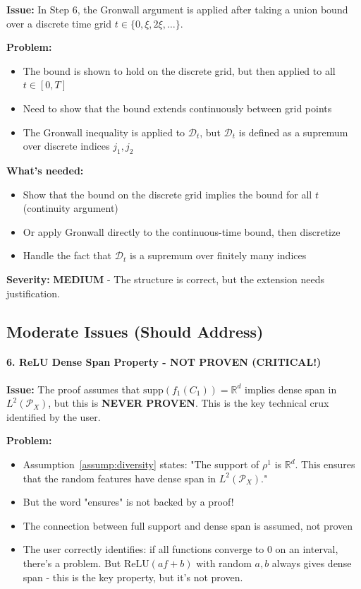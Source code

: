 \textbf{Issue:} In Step 6, the Gronwall argument is applied after taking a union bound over a discrete time grid $t \in \{0, \xi, 2\xi, \ldots\}$.

\textbf{Problem:}
\begin{itemize}
\item The bound is shown to hold on the discrete grid, but then applied to all $t \in [0, T]$
\item Need to show that the bound extends continuously between grid points
\item The Gronwall inequality is applied to $\mathscr{D}_t$, but $\mathscr{D}_t$ is defined as a supremum over discrete indices $j_1, j_2$
\end{itemize}

\textbf{What's needed:}
\begin{itemize}
\item Show that the bound on the discrete grid implies the bound for all $t$ (continuity argument)
\item Or apply Gronwall directly to the continuous-time bound, then discretize
\item Handle the fact that $\mathscr{D}_t$ is a supremum over finitely many indices
\end{itemize}

\textbf{Severity:} \textbf{MEDIUM} - The structure is correct, but the extension needs justification.

\subsection{Moderate Issues (Should Address)}

\paragraph*{6. ReLU Dense Span Property - NOT PROVEN (CRITICAL!)}

\textbf{Issue:} The proof assumes that $\text{supp}(f_1(C_1)) = \mathbb{R}^d$ implies dense span in $L^2(\mathcal{P}_X)$, but this is \textbf{NEVER PROVEN}. This is the key technical crux identified by the user.

\textbf{Problem:}
\begin{itemize}
\item Assumption~\ref{assump:diversity} states: "The support of $\rho^1$ is $\mathbb{R}^d$. This ensures that the random features have dense span in $L^2(\mathcal{P}_X)$."
\item But the word "ensures" is not backed by a proof!
\item The connection between full support and dense span is assumed, not proven
\item The user correctly identifies: if all functions converge to 0 on an interval, there's a problem. But $\text{ReLU}(af+b)$ with random $a,b$ always gives dense span - this is the key property, but it's not proven.
\end{itemize}

